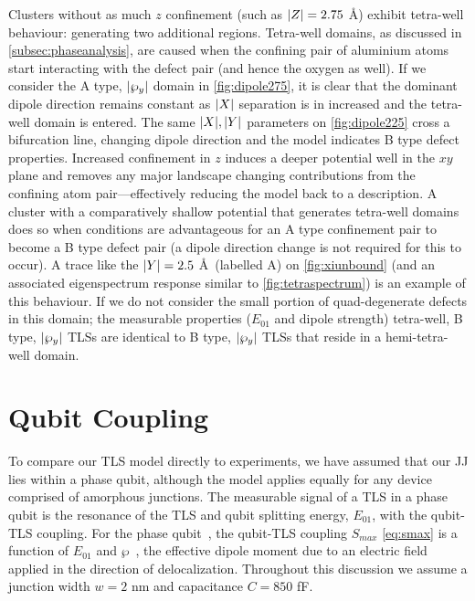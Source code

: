 Clusters without as much $z$ confinement (such as $\lvert Z\rvert = 2.75$ \AA) exhibit tetra-well behaviour: generating two additional regions.
Tetra-well domains, as discussed in \cref{subsec:phaseanalysis}, are caused when the confining pair of aluminium atoms start interacting with the defect pair (and hence the oxygen as well).
If we consider the A type, $\lvert\wp_y\rvert$ domain in \cref{fig:dipole275}, it is clear that the dominant dipole direction remains constant as $\lvert X\rvert$ separation is in increased and the tetra-well domain is entered.
The same $\lvert X\rvert,\lvert Y\rvert$ parameters on \cref{fig:dipole225} cross a bifurcation line, changing dipole direction and the model indicates B type defect properties.
Increased confinement in $z$ induces a deeper potential well in the $xy$ plane and removes any major landscape changing contributions from the confining atom pair---effectively reducing the model back to a  description.
A cluster with a comparatively shallow potential that generates tetra-well domains does so when conditions are advantageous for an A type confinement pair to become a B type defect pair (a dipole direction change is not required for this to occur).
A trace like the $\lvert Y\rvert = 2.5$ \AA\ (labelled A) on \cref{fig:xiunbound} (and an associated eigenspectrum response similar to \cref{fig:tetraspectrum}) is an example of this behaviour.
If we do not consider the small portion of quad-degenerate defects in this domain; the measurable properties (\ie $E_{01}$ and dipole strength) tetra-well, B type, $\lvert\wp_y\rvert$ TLSs are identical to B type, $\lvert\wp_y\rvert$ TLSs that reside in a hemi-tetra-well domain.


\section{Qubit Coupling}\label{sec:smax}

To compare our TLS model directly to experiments, we have assumed that our JJ lies within a phase qubit, although the model applies equally for any device comprised of amorphous junctions.
The measurable signal of a TLS in a phase qubit is the resonance of the TLS and qubit splitting energy, $E_{01}$, with the qubit-TLS coupling.
For the phase qubit~\cite{Martinis2005}, the qubit-TLS coupling $S_{max}$ \cref{eq:smax} is a function of $E_{01}$ and $\wp$~\cite{Kofman2007}, the effective dipole moment due to an electric field applied in the direction of delocalization.
Throughout this discussion we assume a junction width $w = 2$ nm and capacitance $C = 850$ fF.

